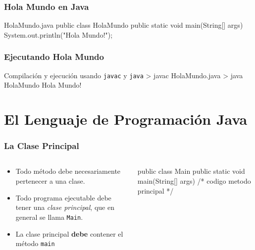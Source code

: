 \documentclass{beamer}
\begin{document}
\begin{frame}[fragile]
  \frametitle{Hola Mundo en Java}

  \begin{java}{HolaMundo.java}
    public class HolaMundo {
      public static void main(String[] args) {
        System.out.println("Hola Mundo!");
      }
    }
  \end{java}

\end{frame}

\begin{frame}[fragile]
  \frametitle{Ejecutando Hola Mundo}

  \begin{bash}{Compilación y ejecución usando {\tt javac} y {\tt java}}
    > javac HolaMundo.java
    > java HolaMundo
    Hola Mundo!
  \end{bash}

\end{frame}

\section{El Lenguaje de Programación Java}

\begin{frame}[fragile]
  \frametitle{La Clase Principal}  
  \begin{columns}
    \begin{column}{0.4\textwidth}
      \begin{itemize}
      \item Todo método debe necesariamente pertenecer a una
        clase.

      \item Todo programa ejecutable debe tener una \emph{clase
          principal}, que en general se llama {\tt Main}.

      \item La clase principal \textbf{debe} contener el método {\tt main}
    \end{itemize}
    \end{column}
    
    \begin{column}{0.6\textwidth}
      
      \begin{jsmall}
        public class Main {
          public static void main(String[] args) {
            /* codigo metodo principal */
          }
        }
      \end{jsmall}
      
    \end{column}
  \end{columns}
\end{frame}
\end{document}
